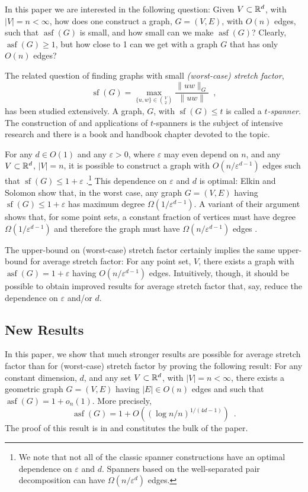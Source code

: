 \documentclass{patmorin}
\DeclareMathOperator{\asf}{asf}
\DeclareMathOperator{\strf}{sf}
\newcommand{\eps}{\varepsilon}
\begin{document}
In this paper we are interested in the following question: Given
$V\subset\mathbb{R}^d$, with $|V|=n<\infty$, how does one construct a graph,
$G=(V,E)$, with $O(n)$ edges, such that $\asf(G)$ is small, and how small
can we make $\asf(G)$?  Clearly, $\asf(G)\ge 1$, but how close to 1 can
we get with a graph $G$ that has only $O(n)$ edges?

The related question of finding graphs with small \emph{(worst-case)
stretch factor},
\[
    \strf(G) = \max_{\{u,w\}\in\binom{V}{2}}\frac{\|uw\|_G}{\|uw\|}  \enspace ,
\]
has been studied extensively.  A graph, $G$, with $\strf(G)\le t$ is
called a \emph{$t$-spanner}.  The construction of and applications
of $t$-spanners is the subject of intensive research and there
is a book \cite{narasimhan.smid:geometric} and handbook chapter
\cite{eppstein:spanning} devoted to the topic.

For any $d\in O(1)$ and any $\eps >0$, where $\eps$ may even depend
on $n$, and any $V\subset\mathbb{R}^d$, $|V|=n$, it is possible to construct
a graph with $O(n/\eps^{d-1})$ edges such that $\strf(G)\le 1+\eps$
\cite{carmi.smid:optimal,ruppert.seidel:approximating}.\footnote{We
note that not all of the classic spanner constructions have an
optimal dependence on $\eps$ and $d$.  Spanners based on the
well-separated pair decomposition \cite{callahan.kosaraju:faster}
can have $\Omega(n/\eps^d)$ edges.}  This dependence on $\eps$ and $d$
is optimal: Elkin and Solomon \cite{elkin.solomon:steiner} show that,
in the worst case, any graph $G=(V,E)$ having $\strf(G)\le 1+\eps$
has maximum degree $\Omega(1/\eps^{d-1})$.  A variant of their argument
shows that, for some point sets, a constant fraction of vertices must
have degree $\Omega(1/\eps^{d-1})$ and therefore the graph must have
$\Omega(n/\eps^{d-1})$ edges \cite{solomon}.

The upper-bound on (worst-case) stretch factor certainly implies the same
upper-bound for average stretch factor: For any point set, $V$, there
exists a graph with $\asf(G)=1+\eps$ having $O(n/\eps^{d-1})$ edges.
Intuitively, though, it should be possible to obtain improved results
for average stretch factor that, say, reduce the dependence on $\eps$
and/or $d$.

\subsection{New Results}

In this paper, we show that much stronger results are possible for
average stretch factor than for (worst-case) stretch factor by proving
the following result: For any constant dimension, $d$, and any set
$V\subset \mathbb{R}^d$, with $|V|=n<\infty$, there exists a geometric graph
$G=(V,E)$ having $|E|\in O(n)$ edges and such that $\asf(G)=1+o_n(1)$.
More precisely,
\[
   \asf(G)=1+O((\log n/n)^{1/(4d-1)}) \enspace .
\]
The proof of this result is in  and constitutes the
bulk of the paper.  
\end{document}
